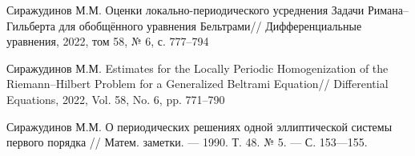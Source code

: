 \documentclass[a4paper,12pt]{article}
\theoremstyle{definition}
\begin{document}
\begin{thebibliography}{22}
  	Сиражудинов М.М. Оценки локально-периодического усреднения Задачи Римана–Гильберта для обобщённого уравнения Бельтрами// Дифференциальные уравнения, 2022, том 58, № 6, с. 777–794

  	Сиражудинов М.М. Estimates for the Locally Periodic Homogenization of the Riemann–Hilbert Problem for a Generalized Beltrami Equation// Differential Equations, 2022, Vol. 58, No. 6, pp. 771–790

   Сиражудинов М.М. О периодических решениях одной
  	эллиптической системы первого порядка //  Матем. заметки.
  	--- 1990.  Т. 48. № 5. --- С. 153---155.
\end{thebibliography}
\end{document}
